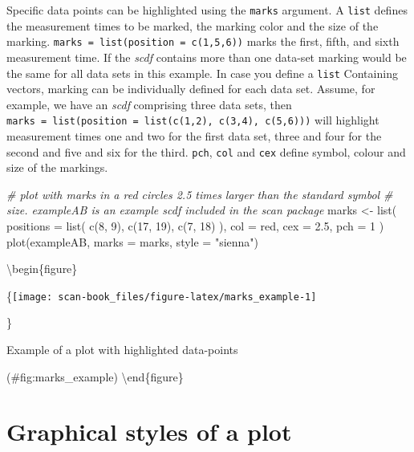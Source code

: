 \documentclass[
]{book}
\newenvironment{Shaded}{\begin{snugshade}}{\end{snugshade}}
\newcommand{\AttributeTok}[1]{\textcolor[rgb]{0.77,0.63,0.00}{#1}}
\newcommand{\CommentTok}[1]{\textcolor[rgb]{0.56,0.35,0.01}{\textit{#1}}}
\newcommand{\DecValTok}[1]{\textcolor[rgb]{0.00,0.00,0.81}{#1}}
\newcommand{\FloatTok}[1]{\textcolor[rgb]{0.00,0.00,0.81}{#1}}
\newcommand{\FunctionTok}[1]{\textcolor[rgb]{0.00,0.00,0.00}{#1}}
\newcommand{\NormalTok}[1]{#1}
\newcommand{\OtherTok}[1]{\textcolor[rgb]{0.56,0.35,0.01}{#1}}
\newcommand{\StringTok}[1]{\textcolor[rgb]{0.31,0.60,0.02}{#1}}
\begin{document}
Specific data points can be highlighted using the \texttt{marks} argument. A \texttt{list} defines the measurement times to be marked, the marking color and the size of the marking. \texttt{marks\ =\ list(position\ =\ c(1,5,6))} marks the first, fifth, and sixth measurement time. If the \emph{scdf} contains more than one data-set marking would be the same for all data sets in this example. In case you define a \texttt{list} Containing vectors, marking can be individually defined for each data set. Assume, for example, we have an \emph{scdf} comprising three data sets, then \texttt{marks\ =\ list(position\ =\ list(c(1,2),\ c(3,4),\ c(5,6)))} will highlight measurement times one and two for the first data set, three and four for the second and five and six for the third. \texttt{pch}, \texttt{col} and \texttt{cex} define symbol, colour and size of the markings.

\begin{Shaded}
\begin{Highlighting}[]
\CommentTok{\# plot with marks in a red circles 2.5 times larger than the standard symbol }
\CommentTok{\# size. exampleAB is an example scdf included in the scan package}
\NormalTok{marks }\OtherTok{\textless{}{-}} \FunctionTok{list}\NormalTok{(}
  \AttributeTok{positions =} \FunctionTok{list}\NormalTok{( }\FunctionTok{c}\NormalTok{(}\DecValTok{8}\NormalTok{, }\DecValTok{9}\NormalTok{), }\FunctionTok{c}\NormalTok{(}\DecValTok{17}\NormalTok{, }\DecValTok{19}\NormalTok{), }\FunctionTok{c}\NormalTok{(}\DecValTok{7}\NormalTok{, }\DecValTok{18}\NormalTok{) ), }
  \AttributeTok{col =} \StringTok{\textquotesingle{}red\textquotesingle{}}\NormalTok{, }\AttributeTok{cex =} \FloatTok{2.5}\NormalTok{, }\AttributeTok{pch =} \DecValTok{1}
\NormalTok{)}
\FunctionTok{plot}\NormalTok{(exampleAB, }\AttributeTok{marks =}\NormalTok{ marks, }\AttributeTok{style =} \StringTok{"sienna"}\NormalTok{)}
\end{Highlighting}
\end{Shaded}

\textbackslash begin\{figure\}

\{\centering \texttt{[image: scan-book\_files/figure-latex/marks\_example-1]}

\}

\caption{Example of a plot with highlighted data-points}

(\#fig:marks\_example)
\textbackslash end\{figure\}

\hypertarget{graphical-styles-of-a-plot}{%
\section{Graphical styles of a plot}\label{graphical-styles-of-a-plot}}
\end{document}

